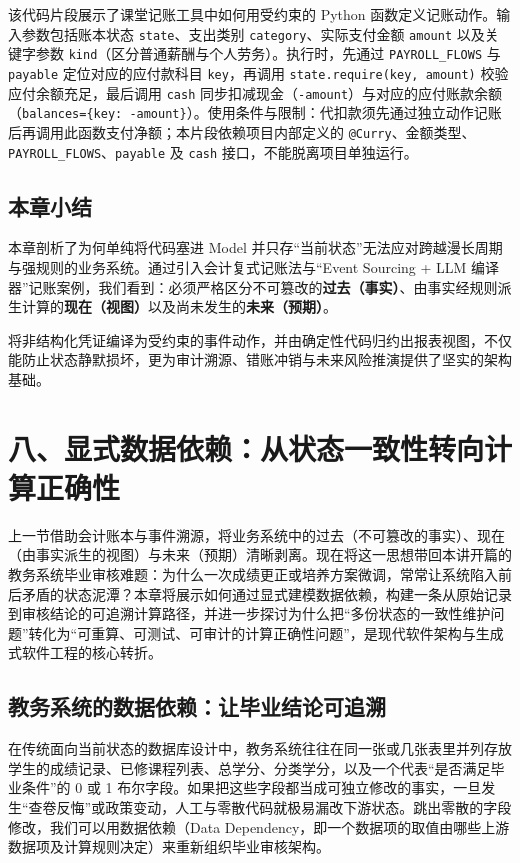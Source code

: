 \documentclass[UTF8,a4paper,11pt,fontset=fandol]{ctexart}
\begin{document}
该代码片段展示了课堂记账工具中如何用受约束的 Python 函数定义记账动作。输入参数包括账本状态 \texttt{state}、支出类别 \texttt{category}、实际支付金额 \texttt{amount} 以及关键字参数 \texttt{kind}（区分普通薪酬与个人劳务）。执行时，先通过 \texttt{PAYROLL\_FLOWS} 与 \texttt{payable} 定位对应的应付款科目 \texttt{key}，再调用 \texttt{state.require(key, amount)} 校验应付余额充足，最后调用 \texttt{cash} 同步扣减现金（\texttt{-amount}）与对应的应付账款余额（\texttt{balances=\{key: -amount\}}）。使用条件与限制：代扣款须先通过独立动作记账后再调用此函数支付净额；本片段依赖项目内部定义的 \texttt{@Curry}、金额类型、\texttt{PAYROLL\_FLOWS}、\texttt{payable} 及 \texttt{cash} 接口，不能脱离项目单独运行。

\subsection{本章小结}

本章剖析了为何单纯将代码塞进 Model 并只存“当前状态”无法应对跨越漫长周期与强规则的业务系统。通过引入会计复式记账法与“Event Sourcing + LLM 编译器”记账案例，我们看到：必须严格区分不可篡改的\textbf{过去（事实）}、由事实经规则派生计算的\textbf{现在（视图）}以及尚未发生的\textbf{未来（预期）}。

将非结构化凭证编译为受约束的事件动作，并由确定性代码归约出报表视图，不仅能防止状态静默损坏，更为审计溯源、错账冲销与未来风险推演提供了坚实的架构基础。

\section{八、显式数据依赖：从状态一致性转向计算正确性}

上一节借助会计账本与事件溯源，将业务系统中的过去（不可篡改的事实）、现在（由事实派生的视图）与未来（预期）清晰剥离。现在将这一思想带回本讲开篇的教务系统毕业审核难题：为什么一次成绩更正或培养方案微调，常常让系统陷入前后矛盾的状态泥潭？本章将展示如何通过显式建模数据依赖，构建一条从原始记录到审核结论的可追溯计算路径，并进一步探讨为什么把“多份状态的一致性维护问题”转化为“可重算、可测试、可审计的计算正确性问题”，是现代软件架构与生成式软件工程的核心转折。

\subsection{教务系统的数据依赖：让毕业结论可追溯}

在传统面向当前状态的数据库设计中，教务系统往往在同一张或几张表里并列存放学生的成绩记录、已修课程列表、总学分、分类学分，以及一个代表“是否满足毕业条件”的 0 或 1 布尔字段。如果把这些字段都当成可独立修改的事实，一旦发生“查卷反悔”或政策变动，人工与零散代码就极易漏改下游状态。跳出零散的字段修改，我们可以用数据依赖（Data Dependency，即一个数据项的取值由哪些上游数据项及计算规则决定）来重新组织毕业审核架构。
\end{document}

